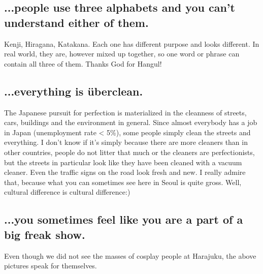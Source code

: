 \begin{post}
\begin{content}
\subsection{...people use three alphabets and you can't understand either of them.}
Kenji, Hiragana, Katakana. Each one has different purpose and looks different. In real world, they are, however mixed up together, so one word or phrase can contain all three of them. Thanks God for Hangul!

\subsection{...everything is überclean.}
The Japanese pursuit for perfection is materialized in the cleanness of streets, cars, buildings and the environment in general. Since almost everybody has a job in Japan (unemployment rate < 5\%), some people simply clean the streets and everything. I don't know if it's simply because there are more cleaners than in other countries, people do not litter that much or the cleaners are perfectionists, but the streets in particular look like they have been cleaned with a vacuum cleaner. Even the traffic signs on the road look fresh and new. I really admire that, because what you can sometimes see here in Seoul is quite gross. Well, cultural difference is cultural difference:)

\subsection{...you sometimes feel like you are a part of a big freak show.}
Even though we did not see the masses of cosplay people at Harajuku, the above pictures speak for themselves.\begin{figure}[!h]
\centering
{}
\end{figure}

\end{content}
\end{post}
